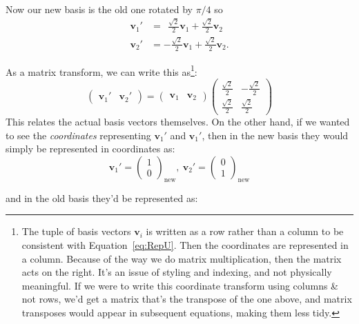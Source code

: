 \documentclass[../master.tex]{subfiles}
\begin{document}
	Now our new basis is the old one rotated by $\pi/4$ so 
	\begin{align*}
		\mathbf v_1' &= ~~ \frac{\sqrt 2}{2} \mathbf v_1 + \frac{\sqrt 2}{2} \mathbf v_2\\
		\mathbf v_2' &= - \frac{\sqrt 2}{2}\mathbf v_1 + \frac{\sqrt 2}{2}\mathbf v_2.
	\end{align*}
	
	
	As a matrix transform, we can write this as\footnote{The tuple of basis vectors $\mathbf v_i$ is written as a row rather than a column to be consistent with Equation~\eqref{eq:RepU}. Then the coordinates are represented in a column. Because of the way we do matrix multiplication, then the matrix acts on the right. It's an issue of styling and indexing, and not physically meaningful. If we were to write this coordinate transform using columns \& not rows, we'd get a matrix that's the transpose of the one above, and matrix transposes would appear in subsequent equations, making them less tidy.}:
	\begin{equation*}
		\begin{pmatrix}
			\mathbf v_1' & \mathbf v_2'
		\end{pmatrix}
		= 
		\begin{pmatrix}
			\mathbf v_1 & \mathbf v_2
		\end{pmatrix}
		\begin{pmatrix}
					 \frac{\sqrt 2}{2} &  -\frac{\sqrt 2}{2} \\
					 \frac{\sqrt 2}{2} &  \frac{\sqrt 2}{2}
		\end{pmatrix}
	\end{equation*}
	This relates the actual basis vectors themselves. On the other hand, if we wanted to see the \emph{coordinates} representing $\mathbf v_1'$ and $\mathbf v_1'$, then in the new basis they would simply be represented in coordinates as: 
	\begin{equation*}
		\mathbf v_1' = \begin{pmatrix}
			1 \\ 0
		\end{pmatrix}_{\mathrm{new}}, ~
		\mathbf v_2' = \begin{pmatrix}
			0 \\ 1
		\end{pmatrix}_{\mathrm{new}}
	\end{equation*}
	
	and in the old basis they'd be represented as:
	
\end{document}
